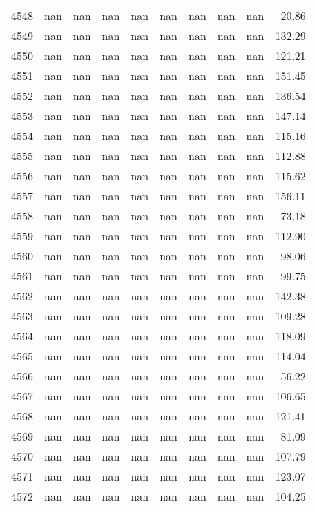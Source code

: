 \begin{tabular}{lrrrrrrrrr}
4548 & nan & nan & nan & nan & nan & nan & nan & nan & 20.86 \\
4549 & nan & nan & nan & nan & nan & nan & nan & nan & 132.29 \\
4550 & nan & nan & nan & nan & nan & nan & nan & nan & 121.21 \\
4551 & nan & nan & nan & nan & nan & nan & nan & nan & 151.45 \\
4552 & nan & nan & nan & nan & nan & nan & nan & nan & 136.54 \\
4553 & nan & nan & nan & nan & nan & nan & nan & nan & 147.14 \\
4554 & nan & nan & nan & nan & nan & nan & nan & nan & 115.16 \\
4555 & nan & nan & nan & nan & nan & nan & nan & nan & 112.88 \\
4556 & nan & nan & nan & nan & nan & nan & nan & nan & 115.62 \\
4557 & nan & nan & nan & nan & nan & nan & nan & nan & 156.11 \\
4558 & nan & nan & nan & nan & nan & nan & nan & nan & 73.18 \\
4559 & nan & nan & nan & nan & nan & nan & nan & nan & 112.90 \\
4560 & nan & nan & nan & nan & nan & nan & nan & nan & 98.06 \\
4561 & nan & nan & nan & nan & nan & nan & nan & nan & 99.75 \\
4562 & nan & nan & nan & nan & nan & nan & nan & nan & 142.38 \\
4563 & nan & nan & nan & nan & nan & nan & nan & nan & 109.28 \\
4564 & nan & nan & nan & nan & nan & nan & nan & nan & 118.09 \\
4565 & nan & nan & nan & nan & nan & nan & nan & nan & 114.04 \\
4566 & nan & nan & nan & nan & nan & nan & nan & nan & 56.22 \\
4567 & nan & nan & nan & nan & nan & nan & nan & nan & 106.65 \\
4568 & nan & nan & nan & nan & nan & nan & nan & nan & 121.41 \\
4569 & nan & nan & nan & nan & nan & nan & nan & nan & 81.09 \\
4570 & nan & nan & nan & nan & nan & nan & nan & nan & 107.79 \\
4571 & nan & nan & nan & nan & nan & nan & nan & nan & 123.07 \\
4572 & nan & nan & nan & nan & nan & nan & nan & nan & 104.25 \\

\end{tabular}

